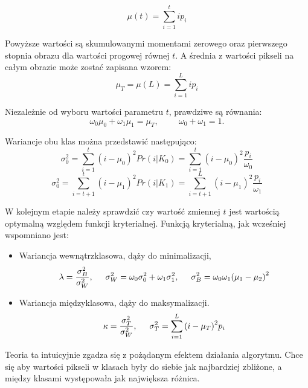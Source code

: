 \documentclass[eng,oneside]{mgr}
\begin{document}
\begin{equation}
\mu(t)=\sum_{i=1}^t ip_i
\end{equation}
\par Powyższe wartości są skumulowanymi momentami zerowego oraz pierwszego stopnia obrazu dla wartości progowej równej $t$. A średnia z wartości pikseli na całym obrazie może zostać zapisana wzorem:
\begin{equation}
\mu_T = \mu(L) = \sum_{i=1}^L ip_i
\end{equation}
\par Niezależnie od wyboru wartości parametru $t$, prawdziwe są równania:
\begin{equation}
\omega_0\mu_0+\omega_1\mu_1=\mu_T, \hspace{1cm} \omega_0+\omega_1=1. 
\end{equation}
\par Wariancje obu klas można przedstawić następująco:
\begin{equation}
\sigma_0^{2}=\sum_{i=1}^t {(i-\mu_0)}^2 Pr(i|K_0)=\sum_{i=1}^t {(i-\mu_0)}^2 \frac{p_i}{\omega_0}
\end{equation}
\begin{equation}
\sigma_0^{2}=\sum_{i=t+1}^t {(i-\mu_1)}^2 Pr(i|K_1)=\sum_{i=t+1}^L {(i-\mu_1)}^2 \frac{p_i}{\omega_1}
\end{equation}
\par W kolejnym etapie należy sprawdzić czy wartość zmiennej $t$ jest wartością optymalną względem funkcji kryterialnej. Funkcją kryterialną, jak wcześniej wspomniano jest:
\begin{itemize}
\item Wariancja wewnątrzklasowa, dąży do minimalizacji,
\begin{equation}
\lambda=\frac{\sigma_B^2}{\sigma_W^2}, \hspace{0.5cm} \sigma_W^2 = \omega_0\sigma_0^2 + \omega_1\sigma_1^2, \hspace{0.5cm} \sigma_B^2 = \omega_0\omega_1{(\mu_1-\mu_2)}^2 
\end{equation}
\item Wariancja międzyklasowa, dąży do maksymalizacji.
\begin{equation}
\kappa=\frac{\sigma_T^2}{\sigma_W^2}, \hspace{0.5cm} \sigma_T^2 = \sum_{i=1}^L {(i-\mu_T)}^2 p_i 
\end{equation}
\end{itemize}
\par Teoria ta intuicyjnie zgadza się z pożądanym efektem działania algorytmu. Chce się aby wartości pikseli w klasach były do siebie jak najbardziej zbliżone, a między klasami występowała jak największa różnica.
\end{document}

